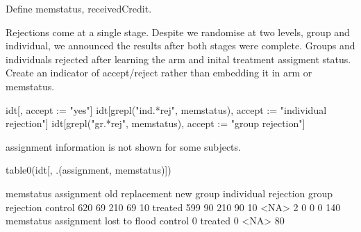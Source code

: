 Define \textsf{memstatus, receivedCredit}.
\begin{Schunk}
\end{Schunk}

	Rejections come at a single stage. Despite we randomise at two levels, group and individual, we announced the results after both stages were complete. Groups and individuals rejected after learning the arm and inital treatment assigment status. Create an indicator of accept/reject rather than embedding it in \textsf{arm} or \textsf{memstatus}. 
\begin{Schunk}
\begin{Sinput}
idt[, accept := "yes"]
idt[grepl("ind.*rej", memstatus), accept := "individual rejection"]
idt[grepl("gr.*rej", memstatus), accept := "group rejection"]
\end{Sinput}
\end{Schunk}

\textsf{assignment} information is not shown for some subjects.
\begin{Schunk}
\begin{Sinput}
table0(idt[, .(assignment, memstatus)])
\end{Sinput}
\begin{Soutput}
          memstatus
assignment old replacement new group individual rejection group rejection
   control 620          69       210                   69              10
   treated 599          90       210                   90              10
   <NA>      2           0         0                    0             140
          memstatus
assignment lost to flood
   control             0
   treated             0
   <NA>               80
\end{Soutput}
\end{Schunk}


